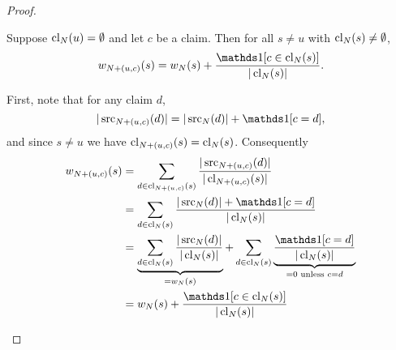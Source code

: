 \begin{proof}
    \begin{claim}
        \label{td_new_claim_wagree_new_report}
        Suppose $\operatorname{cl}_N(u) = \emptyset$ and let $c$ be a claim. Then for all
        $s \ne u$ with $\operatorname{cl}_N(s) \ne \emptyset$,
        \[
            w_{\addclaim{N}{u}{c}}(s) = w_N(s) +
            \frac{\indicator{c \in \claims_N(s)}}{|\claims_N(s)|}.
        \]
    \end{claim}
    \begin{claimproof}
        First, note that for any claim $d$,
        \[
            |\src_{\addclaim{N}{u}{c}}(d)| = |\src_N(d)| + \indicator{c = d},
        \]
        and since $s \ne u$ we have $\operatorname{cl}_{{N} + ({u}, {c})}(s) =
        \operatorname{cl}_N(s)$. Consequently
        \begin{align*}
            w_{\addclaim{N}{u}{c}}(s)
            &= \sum_{d \in \claims_{\addclaim{N}{u}{c}}(s)}{
                \frac{|\src_{\addclaim{N}{u}{c}}(d)|}{|\claims_{\addclaim{N}{u}{c}}(s)|}
            } \\
            &= \sum_{d \in \claims_N(s)}{
                \frac{|\src_N(d)| + \indicator{c = d}}{|\claims_N(s)|}
            } \\
            &=
            \underbrace{
                \sum_{d \in \claims_N(s)}{
                    \frac{|\src_N(d)|}{|\claims_N(s)|}
                }
            }_{= w_N(s)}
            + \sum_{d \in \claims_N(s)}{
                \underbrace{
                    \frac{\indicator{c = d}}{|\claims_N(s)|}
                }_{= 0 \text{ unless } c = d}
            } \\
            &= w_N(s) + \frac{\indicator{c \in \claims_N(s)}}{|\claims_N(s)|}
        \end{align*}
    \end{claimproof}


\end{proof}
